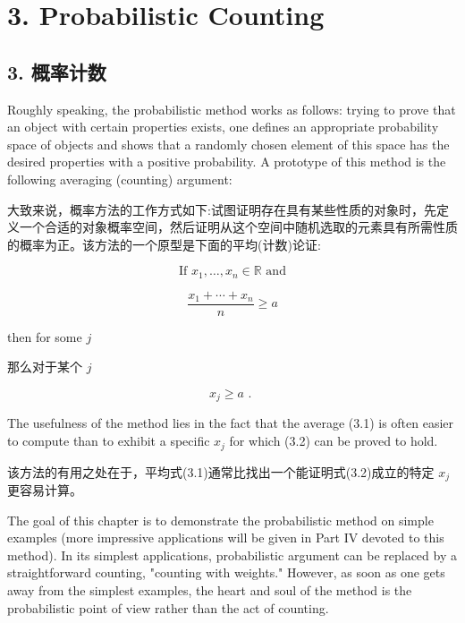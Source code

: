 \documentclass[10pt]{article}
\begin{document}
\section*{3. Probabilistic Counting}

\begin{tcolorbox}\relax
\section*{3. 概率计数}
\end{tcolorbox}

Roughly speaking, the probabilistic method works as follows: trying to prove that an object with certain properties exists, one defines an appropriate probability space of objects and shows that a randomly chosen element of this space has the desired properties with a positive probability. A prototype of this method is the following averaging (counting) argument:

\begin{tcolorbox}\relax
大致来说，概率方法的工作方式如下:试图证明存在具有某些性质的对象时，先定义一个合适的对象概率空间，然后证明从这个空间中随机选取的元素具有所需性质的概率为正。该方法的一个原型是下面的平均(计数)论证:
\end{tcolorbox}

\[
\text{ If }{x}_{1},\ldots ,{x}_{n} \in  \mathbb{R}\text{ and }
\]

\[
\frac{{x}_{1} + \cdots  + {x}_{n}}{n} \geq  a \tag{3.1}
\]

then for some \(j\)

\begin{tcolorbox}\relax
那么对于某个 \(j\)
\end{tcolorbox}

\[
{x}_{j} \geq  a\text{ . } \tag{3.2}
\]

The usefulness of the method lies in the fact that the average (3.1) is often easier to compute than to exhibit a specific \({x}_{j}\) for which (3.2) can be proved to hold.

\begin{tcolorbox}\relax
该方法的有用之处在于，平均式(3.1)通常比找出一个能证明式(3.2)成立的特定 \({x}_{j}\) 更容易计算。
\end{tcolorbox}

The goal of this chapter is to demonstrate the probabilistic method on simple examples (more impressive applications will be given in Part IV devoted to this method). In its simplest applications, probabilistic argument can be replaced by a straightforward counting, "counting with weights." However, as soon as one gets away from the simplest examples, the heart and soul of the method is the probabilistic point of view rather than the act of counting.
\end{document}
